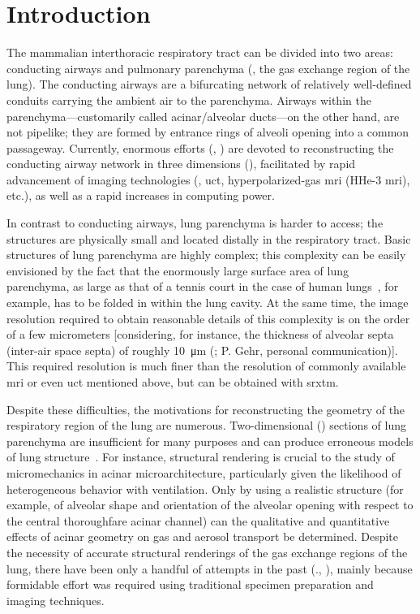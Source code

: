 \section{Introduction}
The mammalian interthoracic respiratory tract can be divided into two areas: conducting airways and pulmonary parenchyma (\ie, the gas exchange region of the lung). The conducting airways are a bifurcating network of relatively well-defined conduits carrying the ambient air to the parenchyma. Airways within the parenchyma---customarily	called	acinar/alveolar ducts---on the other hand, are not pipelike; they are formed by entrance rings of alveoli opening into a common passageway. Currently, enormous efforts (\eg, \cite{Aykac2003,Chaturvedi2005,Cheng2007,Chooi2004,Dame2006,Driehuys2007,Kvistedal2005,Ley2008,Scadeng2007,Sera2003,Tawhai2004,VanErtbruggen2005}) are devoted to reconstructing the conducting airway network in three dimensions (\threed), facilitated by rapid advancement of imaging technologies (\eg, \ac{uct}, hyperpolarized-gas \ac{mri} (HHe-3 \ac{mri}), etc.), as well as a rapid increases in computing power.

In contrast to conducting airways, lung parenchyma is harder to access; the structures are physically small and located distally in the respiratory tract. Basic structures of lung parenchyma are highly complex; this complexity can be easily envisioned by the fact that the enormously large surface area of lung parenchyma, as large as that of a tennis court in the case of human lungs~\cite{Gehr1978,Weibel1963}, for example, has to be folded in within the lung cavity. At the same time, the image resolution required to obtain reasonable details of this complexity is on the order of a few micrometers [considering, for instance, the thickness of alveolar septa (inter-air space septa) of roughly \SI{10}{\micro\meter} (\cite{Gehr1978}; P. Gehr, personal communication)]. This required resolution is much finer than the resolution of commonly available \ac{mri} or even \ac{uct} mentioned above, but can be obtained with \ac{srxtm}.

Despite these difficulties, the motivations for reconstructing the \threed geometry of the respiratory region of the lung are numerous. Two-dimensional (\twod) sections of lung parenchyma are insufficient for many purposes and can produce erroneous models of lung structure~\cite{Cookson1993}. For instance, \threed structural rendering is crucial to the study of micromechanics in \threed acinar microarchitecture, particularly given the likelihood of heterogeneous behavior with ventilation. Only by using a realistic \threed structure (for example, of alveolar shape and orientation of the alveolar opening with respect to the central thoroughfare acinar channel) can the qualitative and quantitative effects of \threed acinar geometry on gas and aerosol transport be determined. Despite the necessity of accurate \threed structural renderings of the gas exchange regions of the lung, there have been only a handful of attempts in the past (\eg., \cite{Berend1991,Cookson1993,Honda2002,Litzlbauer2006,Mercer1987,Mercer1987a,Randell1989,Stelter1966,Watz2005}), mainly because formidable effort was required using traditional specimen preparation and imaging techniques.

